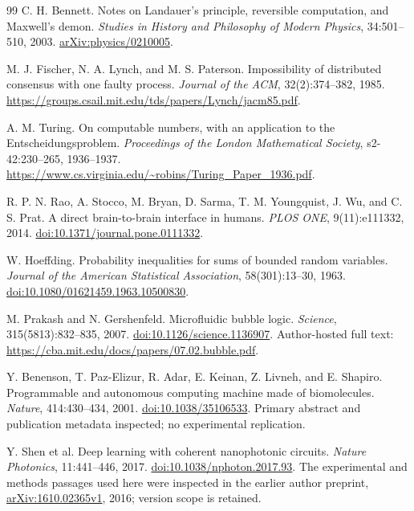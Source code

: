 \begin{thebibliography}{99}
C. H. Bennett. Notes on Landauer's principle, reversible computation, and Maxwell's demon. \emph{Studies in History and Philosophy of Modern Physics}, 34:501--510, 2003. \href{https://arxiv.org/abs/physics/0210005}{arXiv:physics/0210005}.

M. J. Fischer, N. A. Lynch, and M. S. Paterson. Impossibility of distributed consensus with one faulty process. \emph{Journal of the ACM}, 32(2):374--382, 1985. \url{https://groups.csail.mit.edu/tds/papers/Lynch/jacm85.pdf}.

A. M. Turing. On computable numbers, with an application to the Entscheidungsproblem. \emph{Proceedings of the London Mathematical Society}, s2-42:230--265, 1936--1937. \url{https://www.cs.virginia.edu/~robins/Turing_Paper_1936.pdf}.

R. P. N. Rao, A. Stocco, M. Bryan, D. Sarma, T. M. Youngquist, J. Wu, and C. S. Prat. A direct brain-to-brain interface in humans. \emph{PLOS ONE}, 9(11):e111332, 2014. \href{https://doi.org/10.1371/journal.pone.0111332}{doi:10.1371/journal.pone.0111332}.

W. Hoeffding. Probability inequalities for sums of bounded random variables. \emph{Journal of the American Statistical Association}, 58(301):13--30, 1963. \href{https://doi.org/10.1080/01621459.1963.10500830}{doi:10.1080/01621459.1963.10500830}.

M. Prakash and N. Gershenfeld. Microfluidic bubble logic. \emph{Science}, 315(5813):832--835, 2007. \href{https://doi.org/10.1126/science.1136907}{doi:10.1126/science.1136907}. Author-hosted full text: \url{https://cba.mit.edu/docs/papers/07.02.bubble.pdf}.

Y. Benenson, T. Paz-Elizur, R. Adar, E. Keinan, Z. Livneh, and E. Shapiro. Programmable and autonomous computing machine made of biomolecules. \emph{Nature}, 414:430--434, 2001. \href{https://doi.org/10.1038/35106533}{doi:10.1038/35106533}. Primary abstract and publication metadata inspected; no experimental replication.

Y. Shen et al. Deep learning with coherent nanophotonic circuits. \emph{Nature Photonics}, 11:441--446, 2017. \href{https://doi.org/10.1038/nphoton.2017.93}{doi:10.1038/nphoton.2017.93}. The experimental and methods passages used here were inspected in the earlier author preprint, \href{https://arxiv.org/abs/1610.02365}{arXiv:1610.02365v1}, 2016; version scope is retained.


\end{thebibliography}
